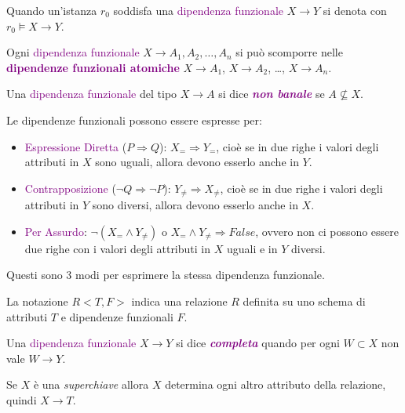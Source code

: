 Quando un'istanza $r_0$ soddisfa una \textcolor{purple}{dipendenza funzionale} $X \rightarrow Y$ si denota
con $r_0 \models X \rightarrow Y$.

\begin{definition}
    Ogni \textcolor{purple}{dipendenza funzionale} $X \rightarrow A_1, A_2, \dots, A_n$
    si può scomporre nelle \textbf{\textcolor{purple}{dipendenze funzionali atomiche}}
    $X \rightarrow A_1$, $X \rightarrow A_2$, \dots, $X \rightarrow A_n$.
\end{definition}

\begin{definition}
    Una \textcolor{purple}{dipendenza funzionale} del tipo
    $X \rightarrow A$ si dice \emph{\textbf{\textcolor{purple}{non banale}}}
    se $A \not\subseteq X$.
\end{definition}

Le dipendenze funzionali possono essere espresse per:
\begin{itemize}
    \item \textcolor{purple}{Espressione Diretta} ($P \Rightarrow Q$): $X_= \Rightarrow Y_=$, cioè
        se in due righe i valori degli attributi in $X$ sono uguali, allora devono esserlo anche in $Y$.
    \item \textcolor{purple}{Contrapposizione} ($\neg Q \Rightarrow \neg P$): $Y_{\neq} \Rightarrow X_{\neq}$, cioè
        se in due righe i valori degli attributi in $Y$ sono diversi, allora devono esserlo anche in $X$.
    \item \textcolor{purple}{Per Assurdo}: $\neg(X_= \land Y_{\neq})$ o $X_= \land Y_{\neq} \Rightarrow False$, ovvero non
        ci possono essere due righe con i valori degli attributi in $X$ uguali e in $Y$ diversi.
\end{itemize}

Questi sono 3 modi per esprimere la stessa dipendenza funzionale.

La notazione $R<T, F>$ indica una relazione $R$ definita su uno schema
di attributi $T$ e dipendenze funzionali $F$.

\begin{definition}
    Una \textcolor{purple}{dipendenza funzionale} $X \rightarrow Y$ si dice \textbf{\emph{\textcolor{purple}{completa}}}
    quando per ogni $W \subset X$ non vale $W \rightarrow Y$.
\end{definition}

Se $X$ è una \emph{superchiave} allora $X$ determina ogni altro attributo
della relazione, quindi $X \rightarrow T$.

